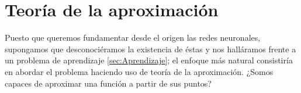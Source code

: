 
\chapter{Teoría de la aproximación}
 \label{chapter:teoria-aproximar}

 Puesto que queremos fundamentar desde el origen las redes neuronales,
 supongamos que desconociéramos la existencia de éstas
 y nos halláramos frente a un problema de aprendizaje \ref{sec:Aprendizaje}; 
 el enfoque más natural consistiría en abordar el problema 
 haciendo uso de teoría de la aproximación.  
 ¿Somos capaces de aproximar una función a partir de sus puntos?





